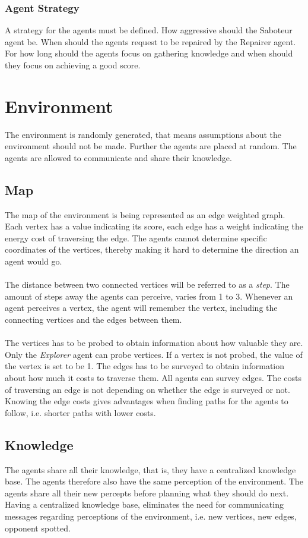 \documentclass[11pt]{article}
\begin{document}
\subsubsection{Agent Strategy}
A strategy for the agents must be defined. How aggressive should the Saboteur agent be. When should the agents request to be repaired by the Repairer agent. For how long should the agents focus on gathering knowledge and when should they focus on achieving a good score.

\section{Environment}
The environment is randomly generated, that means assumptions about the environment should not be made. Further the agents are placed at random. The agents are allowed to communicate and share their knowledge.

\subsection{Map}
The map of the environment is being represented as an edge weighted graph. Each vertex has a value indicating its score, each edge has a weight indicating the energy cost of traversing the edge. The agents cannot determine specific coordinates of the vertices, thereby making it hard to determine the direction an agent would go.\\
\\
The distance between two connected vertices will be referred to as a \emph{step}. The amount of steps away the agents can perceive, varies from 1 to 3. Whenever an agent perceives a vertex, the agent will remember the vertex, including the connecting vertices and the edges between them.\\
\\
The vertices has to be probed to obtain information about how valuable they are. Only the \emph{Explorer} agent can probe vertices. If a vertex is not probed, the value of the vertex is set to be 1. The edges has to be surveyed to obtain information about how much it costs to traverse them. All agents can survey edges. The costs of traversing an edge is not depending on whether the edge is surveyed or not. Knowing the edge costs gives advantages when finding paths for the agents to follow, i.e. shorter paths with lower costs.

\subsection{Knowledge}
The agents share all their knowledge, that is, they have a centralized knowledge base. The agents therefore also have the same perception of the environment. The agents share all their new percepts before planning what they should do next. Having a centralized knowledge base, eliminates the need for communicating messages regarding perceptions of the environment, i.e. new vertices, new edges, opponent spotted.
\end{document}
